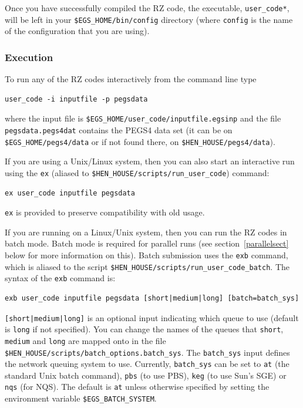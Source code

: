 \documentclass[12pt,twoside]{article}  %
\begin{document}
Once you have successfully compiled the RZ code, the executable,
{\tt user\_code*}, will be left in your {\tt \$EGS\_HOME/bin/config} directory
(where {\tt config} is the name of the configuration that you are using).

\subsubsection{Execution}
\label{execsect}

To run any of the RZ codes interactively from the command line type
\begin{verbatim}
user_code -i inputfile -p pegsdata
\end{verbatim}
where the input file is {\tt \$EGS\_HOME/user\_code/inputfile.egsinp} and the
file\\
 {\tt pegsdata.pegs4dat} contains the PEGS4 data set (it can be on
{\tt \$EGS\_HOME/pegs4/data} or if not found there, on
{\tt \$HEN\_HOUSE/pegs4/data}).

If you are using a Unix/Linux system, then you can also start
an interactive run using
the {\tt ex} (aliased to {\tt \$HEN\_HOUSE/scripts/run\_user\_code})
command:
\begin{verbatim}
ex user_code inputfile pegsdata
\end{verbatim}
{\tt ex} is provided to preserve compatibility with old usage.

If you are running on a Linux/Unix system, then you can run
the RZ codes in batch mode.  Batch mode is required for
parallel runs (see section~\ref{parallelsect} below for more information
on this).
Batch submission uses the {\tt exb} command, which is aliased to
the script {\tt \$HEN\_HOUSE/scripts/run\_user\_code\_batch}.  The syntax
of the {\tt exb} command is:
\begin{verbatim}
exb user_code inputfile pegsdata [short|medium|long] [batch=batch_sys]
\end{verbatim}
    
{\tt [short|medium|long]} is an optional
input indicating which queue to use (default is {\tt long} if not
specified).  You can change the names of the queues that {\tt short},
{\tt medium} and {\tt long} are mapped onto in the
file {\tt \$HEN\_HOUSE/scripts/batch\_options.batch\_sys}.
The {\tt batch\_sys} input
defines the network queuing system to use.  Currently,
{\tt batch\_sys} can be set to {\tt at} (the standard Unix batch
command), {\tt pbs} (to use PBS), {\tt keg} (to use Sun's SGE) or
{\tt nqs} (for NQS).  The default is {\tt at} unless otherwise specified
by setting the environment variable {\tt \$EGS\_BATCH\_SYSTEM}.
\end{document}
